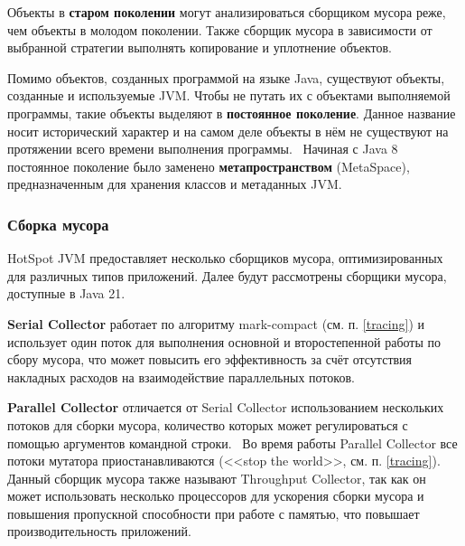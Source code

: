 Объекты в \textbf{старом поколении} могут анализироваться сборщиком мусора реже, чем объекты в молодом поколении. Также сборщик мусора в зависимости от выбранной стратегии выполнять копирование и уплотнение объектов.~\cite{java_storage_management}~\cite{java_memory}

Помимо объектов, созданных программой на языке Java, существуют объекты, созданные и используемые JVM. Чтобы не путать их с объектами выполняемой программы, такие объекты выделяют в \textbf{постоянное поколение}. Данное название носит исторический характер и на самом деле объекты в нём не существуют на протяжении всего времени выполнения программы.~\cite{java_storage_management} Начиная с Java 8 постоянное поколение было заменено \textbf{метапространством} (MetaSpace), предназначенным для хранения классов и метаданных JVM.~\cite{java_presentation}

\subsubsection*{Сборка мусора}

HotSpot JVM предоставляет несколько сборщиков мусора, оптимизированных для различных типов приложений. Далее будут рассмотрены сборщики мусора, доступные в Java 21.~\cite{java_21_available_collectors}

\textbf{Serial Collector} работает по алгоритму mark-compact (см. п. \ref{tracing}) и использует один поток для выполнения основной и второстепенной работы по сбору мусора, что может повысить его эффективность за счёт отсутствия накладных расходов на взаимодействие параллельных потоков.~\cite{java_21_available_collectors}

\textbf{Parallel Collector} отличается от Serial Collector использованием нескольких потоков для сборки мусора, количество которых может регулироваться с помощью аргументов командной строки.~\cite{java_21_available_collectors} Во время работы Parallel Collector все потоки мутатора приостанавливаются (<<stop the world>>, см. п. \ref{tracing}).~\cite{java_jrockit_memory} Данный сборщик мусора также называют Throughput Collector, так как он может использовать несколько процессоров для ускорения сборки мусора и повышения пропускной способности при работе с памятью, что повышает производительность приложений.~\cite{java_gc_basics}


